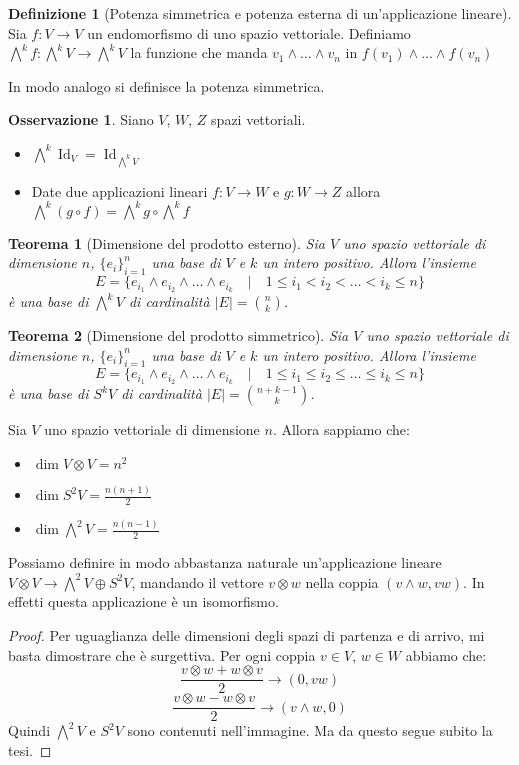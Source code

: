 \documentclass[11pt]{article}
\theoremstyle{plain}
\newtheorem{thm}{Teorema}[section]
\theoremstyle{definition}
\newtheorem{defn}{Definizione}[section]
\newtheorem*{rem}{Osservazione}
\theoremstyle{remark}
\DeclareMathOperator{\Id}{Id}
\begin{document}
\begin{defn}[Potenza simmetrica e potenza esterna di un'applicazione lineare]
Sia $f: V\to V$ un endomorfismo di uno spazio vettoriale. Definiamo
$\bigwedge^k f : \bigwedge^k V \to \bigwedge^k V$ la funzione che manda $v_1 \wedge \ldots \wedge v_n$ in $f(v_1) \wedge \ldots \wedge f(v_n)$

In modo analogo si definisce la potenza simmetrica.
\end{defn}


\begin{rem} Siano $V$, $W$, $Z$ spazi vettoriali.
\begin{itemize}
   \item $\bigwedge^k \Id_V = \Id_{\bigwedge^kV}$
   \item Date due applicazioni lineari $f:V\to W$ e $g:W\to Z$ allora $\bigwedge^k(g\circ f) = \bigwedge^kg\circ\bigwedge^kf$
\end{itemize}
\end{rem}

\begin{thm}[Dimensione del prodotto esterno]
Sia $V$ uno spazio vettoriale di dimensione $n$, $\{e_i\}_{i=1}^n$ una base di $V$ e $k$ un intero positivo.
Allora l'insieme
\[E=\{e_{i_1} \wedge e_{i_2}\wedge \ldots \wedge e_{i_k} \quad|\quad 1 \leq i_1 < i_2 <\ldots< i_k \leq n\}\]
è una base di $\bigwedge^k V$ di cardinalità $|E|= \binom {n}{k}$.
\label{thm:prodotto esterno}
\end{thm}


\begin{thm}[Dimensione del prodotto simmetrico]
Sia $V$ uno spazio vettoriale di dimensione $n$, $\{e_i\}_{i=1}^n$ una base di $V$ e $k$ un intero positivo.
Allora l'insieme
\[E=\{e_{i_1} \wedge e_{i_2}\wedge\ldots \wedge e_{i_k} \quad|\quad 1 \leq i_1 \leq i_2 \leq\ldots\leq i_k \leq n\}\]
è una base di $S^k V$ di cardinalità $|E|= \binom {n+k-1}{k}$.
\label{thm:prodotto simmetrico}
\end{thm}

Sia $V$ uno spazio vettoriale di dimensione $n$. Allora sappiamo che:
\begin{itemize}
\item $\dim V\otimes V = n^2$
\item $\dim S^2V = \frac{n(n+1)}{2}$
\item $\dim \bigwedge^2V = \frac{n(n-1)}{2}$
\end{itemize}
Possiamo definire in modo abbastanza naturale un'applicazione lineare $V\otimes V\to \bigwedge^2V\oplus S^2V$,
mandando il vettore $v\otimes w$ nella coppia $(v\wedge w, vw)$. In effetti questa applicazione è un isomorfismo.
\begin{proof}
Per uguaglianza delle dimensioni degli spazi di partenza e di arrivo, mi basta dimostrare che è surgettiva.
Per ogni coppia $v\in V$, $w\in W$ abbiamo che:
\[\frac{v\otimes w + w\otimes v}{2} \to (0, vw)\]
\[\frac{v\otimes w - w\otimes v}{2} \to (v\wedge w, 0)\]
Quindi $\bigwedge^2V$ e $S^2V$ sono contenuti nell'immagine. Ma da questo segue subito la tesi.
\end{proof}
\end{document}
